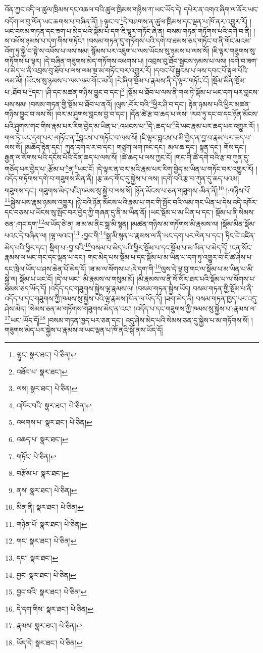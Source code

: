 འོན་ཀྱང་འདི་ལ་ཚུལ་ཁྲིམས་དང་འཆལ་བའི་ཚུལ་ཁྲིམས་གཉིས་ཀ་ཡང་ཡོད་དེ། དཔེར་ན་འགའ་ཞིག་ལ་ནོར་ཡང་བདོག་ལ་བུ་ལོན་ཡང་ཆགས་པ་བཞིན་ནོ། །:ལྟུང་བ་\footnote{ལྟུང་  སྣར་ཐང་།  པེ་ཅིན། }དེ་བཤགས་ན་ཚུལ་ཁྲིམས་དང་ལྡན་པ་ཁོ་ནར་འགྱུར་རོ། །ཡང་བསམ་གཏན་དང་ཟག་པ་མེད་པའི་སྡོམ་པ་དག་ཇི་ལྟར་གཏོང་ཞེ་ན། བསམ་གཏན་གཏོགས་པའི་དགེ་བ་ནི། །ས་འཕོས་ཉམས་པ་དག་གིས་གཏོང་། །བསམ་གཏན་དུ་གཏོགས་པའི་དགེ་བ་ཐམས་ཅད་གཏོང་བ་ནི་གོང་མའམ་འོག་ཏུ་སྐྱེ་བ་སྟེ་ས་འཕོས་པ་ལས་སམ། སྙོམས་པར་འཇུག་པ་ལས་ཡོངས་སུ་ཉམས་པ་ལས་སོ། །ཇི་ལྟར་གཟུགས་སུ་གཏོགས་པ་ལྟར། །དེ་བཞིན་གཟུགས་མེད་གཏོགས་འཕགས་པ། །འབྲས་བུ་ཐོབ་སྦྱངས་ཉམས་པ་ལས། །དགེ་བ་ཟག་པ་མེད་པ་ནི་འབྲས་བུ་ཐོབ་པ་ལས་ལམ་སྔ་མ་གཏོང་བར་འགྱུར་རོ། །དབང་པོ་སྦྱངས་པ་ལས་དབང་པོ་རྟུལ་པོའི་ལམ་མོ། །ཡོངས་སུ་ཉམས་པ་ལས་ལམ་གོང་མའོ། །རེ་ཞིག་སྡོམ་པ་རྣམས་ནི་དེ་ལྟར་གཏོང་ངོ། །སྡོམ་མིན་སྡོམ་པ་:ཐོབ་པ་\footnote{འཐོབ་པ་  སྣར་ཐང་། }དང་། །ཤི་དང་མཚན་གཉིས་བྱུང་བ་དང་།\footnote{ལས།  སྣར་ཐང་།  པེ་ཅིན། } །སྡོམ་པ་ཐོབ་པ་ལས་ནི་གལ་ཏེ་སྡོམ་པ་ཡང་དག་པར་བླངས་པས་སམ། །བསམ་གཏན་གྱི་སྡོམ་པ་ཐོབ་པ་ནའོ། །ལུས་:བོར་བའི་\footnote{འཁོར་བའི་  སྣར་ཐང་།  པེ་ཅིན། }ཕྱིར་ཤི་བ་དང་། རྟེན་ཉམས་པའི་ཕྱིར་མཚན་གཉིས་བྱུང་བ་ལས་སོ། །བར་མ་ཤུགས་བླངས་བྱ་བ་དང་། །དོན་ཚེ་རྩ་བ་ཆད་པ་ལས། །རབ་ཏུ་དང་བ་དང་ཉོན་མོངས་པའི་ཤུགས་གང་གིས་རྣམ་པར་རིག་བྱེད་མ་ཡིན་པ་:འཕངས་པ་\footnote{འཕགས་པ་  སྣར་ཐང་།  པེ་ཅིན། }དེ་:ཆད་པ་\footnote{འཆད་པ་  སྣར་ཐང་། }དེ་ཡང་རྣམ་པར་ཆད་པར་འགྱུར་རོ། །གལ་ཏེ་ཡང་དག་པར་:གཏོང་ན་\footnote{གཏོང་  པེ་ཅིན། }བླངས་པ་གཏོང་བ་ལས་སོ། །ཇི་ལྟར་བླངས་པ་མི་བྱེད་ན་བྱ་བ་རྣམ་པར་ཆད་པ་ལས་སོ། །མཆོད་རྟེན་དང་། ཀུན་དགའ་ར་བ་དང་། གཙུག་ལག་ཁང་དང་། མལ་ཆ་དང་། སྟན་དང་། གོས་དང་། རྒྱན་ལ་སོགས་པའི་དངོས་པོའི་དོན་ཆད་པ་ལས་སོ། །ཚེ་ཆད་པ་ལས་ཀྱང་ངོ། །གང་གི་ཚེ་དགེ་བའི་རྩ་བ་ཀུན་དུ་གཅོད་པར་བྱེད་པ་:རྩོམ་པ་\footnote{བརྩོམ་པ་  སྣར་ཐང་། }ན་\footnote{ནས་  སྣར་ཐང་།  པེ་ཅིན། }ཡང་ངོ། །དེ་ལྟར་ན་བར་མའི་རྣམ་པར་རིག་བྱེད་མ་ཡིན་པ་གཏོང་བར་འགྱུར་རོ། །འདོད་གཏོགས་དགེ་བ་གཟུགས་མིན་ནི། །རྩ་ཆད་གོང་དུ་སྐྱེས་པ་ལས། །དགེ་བའི་རྩ་བ་ཀུན་དུ་ཆད་པའམ། གཟུགས་དང་། གཟུགས་མེད་པའི་ཁམས་སུ་སྐྱེ་བ་ལས་སོ། །ཉོན་མོངས་པ་ཅན་གཟུགས་:མིན་ནོ།\footnote{མིན་ནི།  སྣར་ཐང་།  པེ་ཅིན། } །:གཉིས་པོ་\footnote{གཉེན་པོ་  སྣར་ཐང་།  པེ་ཅིན། }སྐྱེས་པས་རྣམ་ཉམས་འགྱུར། །ཉེ་བའི་ཉོན་མོངས་པའི་རྣམ་པ་གང་གི་སྤོང་བའི་ལམ་གང་ཡིན་པ་དེས་འདི་འཁོར་དང་བཅས་པ་ཡོངས་སུ་སྤོང་བར་བྱེད་ཀྱི་གཞན་དུ་ནི་མ་ཡིན་ནོ། །ཡང་སྡོམ་པ་མ་ཡིན་པ་དང་། སྡོམ་པ་ནི་སེམས་ཅན་:གང་དག་\footnote{གང་  སྣར་ཐང་།  པེ་ཅིན། }ལ་ཡོད་ཅེ་ན། ཟ་མ་མ་ནིང་སྒྲ་མི་སྙན། །མཚན་གཉིས་མ་གཏོགས་མི་རྣམས་ལ། །སྡོམ་མིན་སྡོམ་པའང་དེ་བཞིན་ལ། །ལྷ་ལའང་།\footnote{དང་།  སྣར་ཐང་། } :བྱང་གི་\footnote{བྱང་  སྣར་ཐང་།  པེ་ཅིན། }སྒྲ་མི་སྙན་པ་རྣམས་ལ་ནི་ཡང་དག་པར་ལེན་པ་དང་། ཏིང་ངེ་འཛིན་མེད་པའི་ཕྱིར་དང་། སྡིག་པ་:བྱ་བའི་\footnote{བྱང་བའི་  སྣར་ཐང་།  པེ་ཅིན། }བསམ་པ་མེད་པའི་ཕྱིར་སྡོམ་པ་དང་སྡོམ་པ་མ་ཡིན་པ་མེད་དོ། །ངན་སོང་རྣམས་ལ་ཡང་གང་དང་ལྡན་པ་དང་། གང་མེད་པས་སྡོམ་པ་དང་སྡོམ་པ་མ་ཡིན་པ་དག་ཏུ་འགྱུར་བ་ངོ་ཚ་ཤེས་པ་དང་ཁྲེལ་ཡོད་པ་ཤས་ཆེན་པོ་མེད་དོ། །ཟ་མ་ལ་སོགས་པ་:དེ་དག་གི་\footnote{དེ་དག་གིས་  སྣར་ཐང་།  པེ་ཅིན། }ལུས་དེ་ལྟ་བུ་གང་ལ་སྡོམ་པ་མ་ཡིན་པ་མི་སྐྱེ་ལ། སྡོམ་པ་ཡང་ངོ། །དེ་ལ་ཡང་། མི་རྣམས་ལ་གསུམ་མོ། །མི་རྣམས་ལ་ནི་སོ་སོར་ཐར་པའི་སྡོམ་པ་ལ་སོགས་པ་ཐམས་ཅད་ཡོད་དོ། །འདོད་དང་གཟུགས་སྐྱེས་ལྷ་རྣམས་ལ། །བསམ་གཏན་སྐྱེས་ཡོད། བསམ་གཏན་གྱི་སྡོམ་པ་ནི་འདོད་པ་དང་གཟུགས་ཀྱི་ཁམས་སུ་སྐྱེས་པའི་ལྷ་རྣམས་ཁོ་ན་ལ་ཡོད་དོ། །ཟག་མེད་ནི། བསམ་གཏན་ཁྱད་པར་འདུ་ཤེས་མེད། །སེམས་ཅན་མ་གཏོགས་གཟུགས་མེད་ན་འང་། །འདོད་པ་དང་གཟུགས་ཀྱི་ཁམས་སུ་སྐྱེས་པ་:རྣམས་ལ་\footnote{རྣམས་  སྣར་ཐང་།  པེ་ཅིན། }ཡང་:ཡོད་དོ།\footnote{ཡོད་དེ།  སྣར་ཐང་།  པེ་ཅིན། } །བསམ་གཏན་ཁྱད་པར་ཅན་དང་། འདུ་ཤེས་མེད་པའི་སེམས་ཅན་དུ་སྐྱེས་པ་མ་གཏོགས་སོ། །གཟུགས་མེད་པར་སྐྱེས་པ་རྣམས་ལ་ཡང་ལྡན་པ་ཁོ་ནའི་སྒོ་ནས་ཡོད་དོ། 